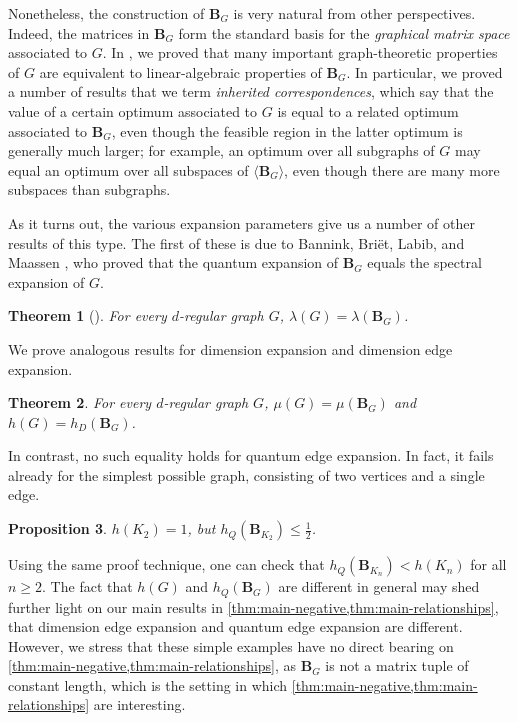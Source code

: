 \documentclass[11pt]{article}
\newtheorem{theorem}{Theorem}[section]
\newtheorem{proposition}[theorem]{Proposition}
\theoremstyle{plain}
\numberwithin{equation}{section}
\theoremstyle{definition}
\newcommand{\tuple}[1]{\mathbf{#1}}
\newcommand{\vB}{\tuple{B}}
\begin{document}
Nonetheless, the construction of $\vB_G$ is very natural from other perspectives. Indeed, the matrices in $\vB_G$ form the standard basis for the \emph{graphical matrix space} associated to $G$. In \cite{moreconnections}, we proved that many important graph-theoretic properties of $G$ are equivalent to linear-algebraic properties of $\vB_G$. In particular, we proved a number of results that we term \emph{inherited correspondences}, which say that the value of a certain optimum associated to $G$ is equal to a related optimum associated to $\vB_G$, even though the feasible region in the latter optimum is generally much larger; for example, an optimum over all subgraphs of $G$ may equal an optimum over all subspaces of $\langle \vB_G\rangle$, even though there are many more subspaces than subgraphs.

As it turns out, the various expansion parameters give us a number of other results of this type. The first of these is due to Bannink, Bri\"{e}t, Labib, and Maassen \cite{quasirandom}, who proved that the quantum expansion of $\vB_G$ equals the spectral expansion of $G$.
\begin{theorem}[{\cite[Proposition 3.7]{quasirandom}}]\label{prop: spectral 
expansion generalization}
For every $d$-regular graph $G$, $\lambda(G)=\lambda(\vB_G)$.
\end{theorem}
We prove analogous results for dimension expansion and dimension edge expansion.

\begin{theorem}\label{thm:graphical-tuple-preserves}
    For every $d$-regular graph $G$, $\mu(G) = \mu(\vB_G)$ and $h(G) = h_D(\vB_G)$.
\end{theorem}


In contrast, no such equality holds for quantum edge expansion. In fact, it fails already for the simplest possible graph, consisting of two vertices and a single edge.
\begin{proposition}\label{prop:hq-k2}
    $h(K_2) =1$, but $h_Q(\vB_{K_2})\leq\frac 12$.
\end{proposition}
Using the same proof technique, one can check that $h_Q(\vB_{K_n}) < h(K_n)$ for all $n \geq 2$. The fact that $h(G)$ and $h_Q(\vB_G)$ are different in general may shed further light on our main results in \cref{thm:main-negative,thm:main-relationships}, that dimension edge expansion and quantum edge expansion are different. However, we stress that these simple examples have no direct bearing on \cref{thm:main-negative,thm:main-relationships}, as $\vB_G$ is not a matrix tuple of constant length, which is the setting in which \cref{thm:main-negative,thm:main-relationships} are interesting.
\end{document}
